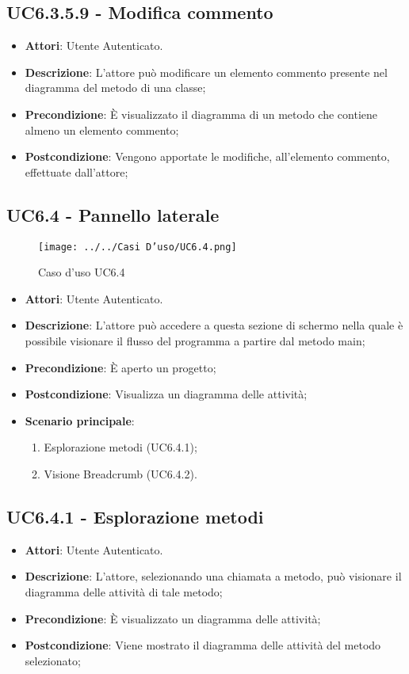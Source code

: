 \subsection{UC6.3.5.9 - Modifica commento} 
\label{ssec:UC6.3.5.9} 
\begin{itemize} 
\item \textbf{Attori}: Utente Autenticato.
\item \textbf{Descrizione}: L'attore può modificare un elemento commento presente nel diagramma del metodo di una classe;
\item \textbf{Precondizione}: È visualizzato il diagramma di un metodo che contiene almeno un elemento commento;
\item \textbf{Postcondizione}: Vengono apportate le modifiche, all'elemento commento, effettuate dall'attore;
\end{itemize} 
\subsection{UC6.4 - Pannello laterale} 
\label{ssec:UC6.4}

\begin{figure}[h!] 
\centering 
\texttt{[image: ../../Casi D'uso/UC6.4.png]} 
\caption{Caso d'uso UC6.4} 
 \end{figure} 
\begin{itemize} 
\item \textbf{Attori}: Utente Autenticato.
\item \textbf{Descrizione}: L'attore può accedere a questa sezione di schermo nella quale è possibile visionare il flusso del programma a partire dal metodo main;
\item \textbf{Precondizione}: È aperto un progetto;
\item \textbf{Postcondizione}: Visualizza un diagramma delle attività;
\item \textbf{Scenario principale}: \begin{enumerate}\item Esplorazione metodi (UC6.4.1);\item Visione Breadcrumb (UC6.4.2). 
 \end{enumerate}
\end{itemize} 
\subsection{UC6.4.1 - Esplorazione metodi} 
\label{ssec:UC6.4.1} 
\begin{itemize} 
\item \textbf{Attori}: Utente Autenticato.
\item \textbf{Descrizione}: L'attore, selezionando una chiamata a metodo, può visionare il diagramma delle attività di tale metodo;
\item \textbf{Precondizione}: È visualizzato un diagramma delle attività;
\item \textbf{Postcondizione}: Viene mostrato il diagramma delle attività del metodo selezionato;
\end{itemize} 
